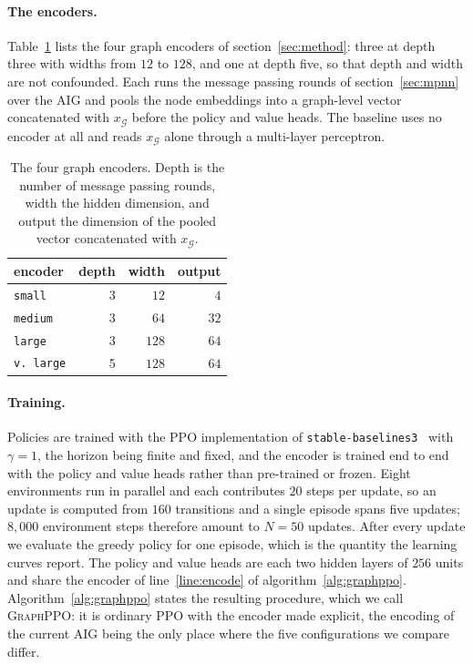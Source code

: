\documentclass{article}
\begin{document}
\paragraph{The encoders.}
Table~\ref{tab:encoders} lists the four graph encoders of section~\ref{sec:method}: three at depth three with widths from $12$ to $128$, and one at depth five, so that depth and width are not confounded.
Each runs the message passing rounds of section~\ref{sec:mpnn} over the AIG and pools the node embeddings into a graph-level vector concatenated with $x_\mathcal{G}$ before the policy and value heads.
The baseline uses no encoder at all and reads $x_\mathcal{G}$ alone through a multi-layer perceptron.

\begin{table}[h]
  \centering
  \caption{The four graph encoders. Depth is the number of message passing rounds, width the hidden dimension, and output the dimension of the pooled vector concatenated with $x_\mathcal{G}$.}
  \label{tab:encoders}
  \begin{tabular}{lrrr}
    \toprule
    encoder & depth & width & output \\
    \midrule
    \texttt{small}     & 3 & $12$  & $4$  \\
    \texttt{medium}    & 3 & $64$  & $32$ \\
    \texttt{large}     & 3 & $128$ & $64$ \\
    \texttt{v.\,large} & 5 & $128$ & $64$ \\
    \bottomrule
  \end{tabular}
\end{table}

\paragraph{Training.}
Policies are trained with the PPO implementation of \texttt{stable-baselines3}~\cite{sb3} with $\gamma = 1$, the horizon being finite and fixed, and the encoder is trained end to end with the policy and value heads rather than pre-trained or frozen.
Eight environments run in parallel and each contributes $20$ steps per update, so an update is computed from $160$ transitions and a single episode spans five updates; $8{,}000$ environment steps therefore amount to $N = 50$ updates.
After every update we evaluate the greedy policy for one episode, which is the quantity the learning curves report.
The policy and value heads are each two hidden layers of $256$ units and share the encoder of line~\ref{line:encode} of algorithm~\ref{alg:graphppo}.
Algorithm~\ref{alg:graphppo} states the resulting procedure, which we call \textsc{GraphPPO}: it is ordinary PPO with the encoder made explicit, the encoding of the current AIG being the only place where the five configurations we compare differ.
\end{document}
